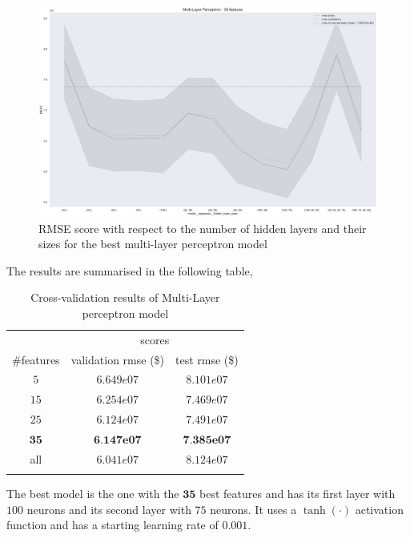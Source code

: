 \begin{figure}[H]
	\centering
	\includegraphics{figures/mlp_eval.pdf}
	\caption{RMSE score with respect to the number of hidden layers and their sizes for the best multi-layer perceptron model}
	\label{fig:mlp_eval1}
\end{figure}

The results are summarised in the following table,
\begin{table}[H]
	\centering
	\begin{tabular}{ccc} \toprule
	  & \multicolumn {2}{c}{scores} \\\cmidrule(lr) {2-3}
	  \#features         & validation rmse (\$)             & test rmse (\$) \\\hline
	  $5$        		& $6.649e07$                      	& $8.101e07$ \\
	  $15$     			& $6.254e07$               			& $7.469e07$ \\
	  $25$        		& $6.124e07$                        & $7.491e07$ \\
	  $\textbf{35}$     & $\textbf{6.147e07}$               & $\textbf{7.385e07}$ \\
	  all             	& $6.041e07$                        & $8.124e07$ \\
	  \\\hline
	\end{tabular}
	\caption{Cross-validation results of Multi-Layer perceptron model}
	\label{tab:mlp-results}
\end{table}

The best model is the one with the $\textbf{35}$ best features and has its first layer with $100$ neurons and its second layer with $75$ neurons. It uses a $\tanh(\cdot)$ activation function and has a starting learning rate of $0.001$.


